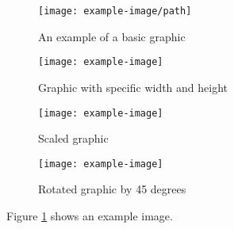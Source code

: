 
\begin{figure}[h] %
    \centering %
    \texttt{[image: example-image/path]} %
    \caption{An example of a basic graphic} %
    \label{fig:example} %
\end{figure}

\begin{figure}[h]
    \centering
    \texttt{[image: example-image]}
    \caption{Graphic with specific width and height}
    \label{fig:size}
\end{figure}

\begin{figure}[h]
    \centering
    \texttt{[image: example-image]}
    \caption{Scaled graphic}
    \label{fig:scale}
\end{figure}

\begin{figure}[h]
    \centering
    \texttt{[image: example-image]}
    \caption{Rotated graphic by 45 degrees}
    \label{fig:rotate}
\end{figure}

Figure \ref{fig:example} shows an example image.